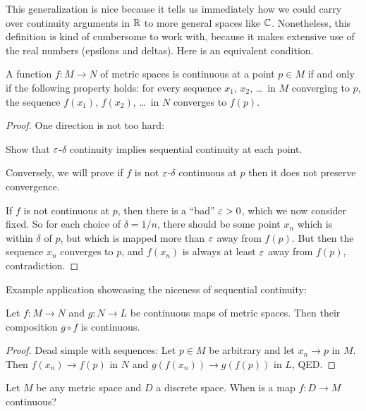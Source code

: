 This generalization is nice because it tells us immediately how we could carry over continuity arguments in $\mathbb R$ to more general spaces like $\mathbb C$.
Nonetheless, this definition is kind of cumbersome to work with,
because it makes extensive use of the real numbers
(epsilons and deltas).
Here is an equivalent condition.
\begin{theorem}
	\label{thm:seq_cont}
	A function $f \colon M \to N$ of metric spaces
	is continuous at a point $p \in M$
	if and only if the following property holds:
	for every sequence $x_1$, $x_2$, \dots\ in $M$ converging to $p$,
	the sequence $f(x_1)$, $f(x_2)$, \dots\ in $N$ converges to $f(p)$.
\end{theorem}
\begin{proof}
	One direction is not too hard:
	\begin{exercise}
		Show that $\varepsilon$-$\delta$ continuity implies sequential continuity
		at each point.
	\end{exercise}
	Conversely, we will prove if $f$ is not $\varepsilon$-$\delta$ continuous at $p$
	then it does not preserve convergence.

	If $f$ is not continuous at $p$, then there is a ``bad'' $\varepsilon > 0$,
	which we now consider fixed.
	So for each choice of $\delta = 1/n$,
	there should be some point $x_n$ which is within $\delta$ of $p$,
	but which is mapped more than $\varepsilon$ away from $f(p)$.
	But then the sequence $x_n$ converges to $p$,
	and $f(x_n)$ is always at least $\varepsilon$ away from $f(p)$, contradiction.
\end{proof}

Example application showcasing the niceness of sequential continuity:
\begin{proposition}
	Let $f \colon M \to N$ and $g \colon N \to L$ be continuous maps of metric spaces.
	Then their composition $g \circ f$ is continuous.
\end{proposition}
\begin{proof}
	Dead simple with sequences:
	Let $p \in M$ be arbitrary and let $x_n \to p$ in $M$.
	Then $f(x_n) \to f(p)$ in $N$ and $g(f(x_n)) \to g(f(p))$ in $L$, QED.
\end{proof}

\begin{ques}
	Let $M$ be any metric space and $D$ a discrete space.
	When is a map $f \colon D \to M$ continuous?
\end{ques}



